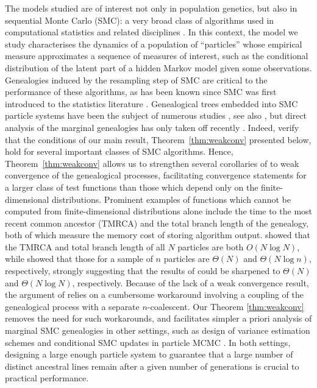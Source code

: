 \documentclass[12pt,authoryear]{article}
\theoremstyle{definition}
\newcommand{\1}[1]{\mathbbm{1}_{#1}}
\begin{document}
The models studied are of interest not only in population genetics, but also in sequential Monte Carlo (SMC): a very broad class of algorithms used in computational statistics and related disciplines \citep[see e.g.][for an introduction]{chopin2020}.  
In this context, the model we study characterises the dynamics of a population of ``particles'' whose empirical measure approximates a sequence of measures of interest, such as the conditional distribution of the latent part of a hidden Markov model given some observations.
Genealogies induced by the resampling step of SMC are critical to the performance of these algorithms, as has been known since SMC was first introduced to the statistics literature \citep{gordon1993}.
Genealogical trees embedded into SMC particle systems have been the subject of numerous studies \citep{delmoral2001b, delmoral2009, delmoral2016}, see also \citet[Chapter 3]{delmoral2004}, but direct analysis of the marginal genealogies has only taken off recently \citep{brown2021, koskela2020annals}. 
Indeed, \citet[Section 4]{brown2021} verify that the conditions of our main result, Theorem~\ref{thm:weakconv} presented below, hold for several important classes of SMC algorithms.
Hence, Theorem~\ref{thm:weakconv} allows us to strengthen several corollaries of \citet{brown2021} to weak convergence of the genealogical processes, facilitating convergence statements for a larger class of test functions than those which depend only on the finite-dimensional distributions.
Prominent examples of functions which cannot be computed from finite-dimensional distributions alone include the time to the most recent common ancestor (TMRCA) and the total branch length of the genealogy, both of which measure the memory cost of storing algorithm output.
\citet{jacob2015} showed that the TMRCA and total branch length of all $N$ particles are both $O( N \log N )$, while \cite{koskela2020annals} showed that those for a sample of $n$ particles are $\Theta( N )$ and $\Theta( N \log n )$, respectively, strongly suggesting that the results of \citet{jacob2015} could be sharpened to $\Theta(N)$ and $\Theta(N \log N)$, respectively.
Because of the lack of a weak convergence result, the argument of \citet[Corollary 2]{koskela2020annals} relies on a cumbersome workaround involving a coupling of the genealogical process with a separate $n$-coalescent.
Our Theorem \ref{thm:weakconv} removes the need for such workarounds, and facilitates simpler a priori analysis of marginal SMC genealogies in other settings, such as design of variance estimation schemes \citep{olsson2019} and conditional SMC updates in particle MCMC \citep{andrieu2010}.
In both settings, designing a large enough particle system to guarantee that a large number of distinct ancestral lines remain after a given number of generations is crucial to practical performance.
\end{document}
